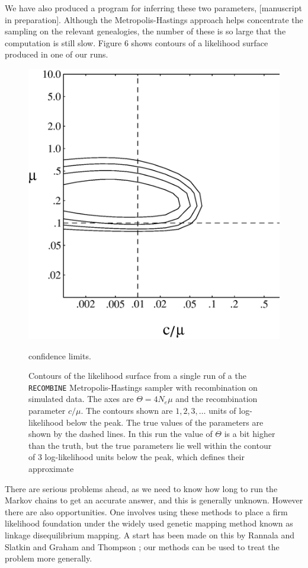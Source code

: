 We have also produced a program for inferring these two parameters,
[manuscript in preparation].  Although the Metropolis-Hastings approach
helps concentrate the sampling on the relevant genealogies, the number of
these is so large that the computation is still slow.  Figure 6 shows contours
of a likelihood surface produced in one of our runs.
\begin{figure} %
\centerline{\includegraphics[width=4.5in]{fig6.ps}}
\caption{Contours of the likelihood surface from a single run of a
the {\tt RECOMBINE} Metropolis-Hastings sampler with recombination on simulated data.  The axes are $\Theta=4N_e\mu$
and the recombination parameter $c/\mu$.  The contours shown are
$1, 2, 3, \ldots$ units of log-likelihood below the peak. The true values of
the parameters are shown by the dashed lines. In this run the value of $\Theta$
is a bit higher than the truth, but the true parameters lie well within the
contour of 3 log-likelihood units below the peak, which defines their approximate }
confidence limits.
\end{figure}
There are serious problems ahead, as we need to know how long to run the
Markov chains to get an accurate answer, and this is generally unknown.
However there are also opportunities.  One involves using these methods to
place a firm likelihood foundation under the widely used genetic mapping
method known as linkage disequilibrium mapping.  A start has been made on this
by Rannala and Slatkin \cite{Rannala}
and Graham and Thompson \cite{Jinko};
our methods can be used to treat the problem more generally.


